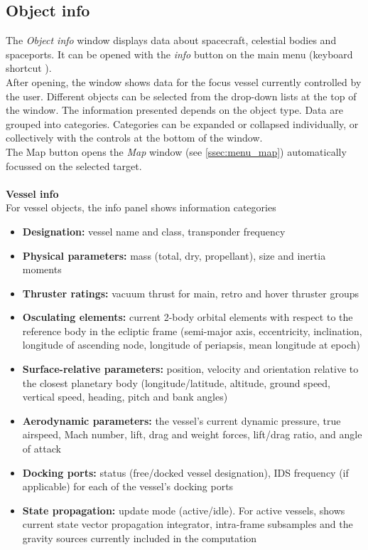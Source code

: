\documentclass[Orbiter User Manual.tex]{subfiles}
\begin{document}
\subsection{Object info}
\label{ssec:menu_info}
The \textit{Object info} window displays data about spacecraft, celestial bodies and spaceports. It can be opened with the \textit{info} button on the main menu (keyboard shortcut \Ctrl{}).\\
After opening, the window shows data for the focus vessel currently controlled by the user. Different objects can be selected from the drop-down lists at the top of the window. The information presented depends on the object type. Data are grouped into categories. Categories can be expanded or collapsed individually, or collectively with the controls at the bottom of the window.\\
The Map button opens the \textit{Map} window (see \ref{ssec:menu_map}) automatically focussed on the selected target.\\
\\
\textbf{Vessel info}\\
For vessel objects, the info panel shows information categories

\begin{figure}[H]
	\centering
\end{figure}

\noindent
\begin{itemize}
\item \textbf{Designation:} vessel name and class, transponder frequency
\item \textbf{Physical parameters:} mass (total, dry, propellant), size and inertia moments
\item \textbf{Thruster ratings:} vacuum thrust for main, retro and hover thruster groups
\item \textbf{Osculating elements:} current 2-body orbital elements with respect to the reference body in the ecliptic frame (semi-major axis, eccentricity, inclination, longitude of ascending node, longitude of periapsis, mean longitude at epoch)
\item \textbf{Surface-relative parameters:} position, velocity and orientation relative to the closest planetary body (longitude/latitude, altitude, ground speed, vertical speed, heading, pitch and bank angles)
\item \textbf{Aerodynamic parameters:} the vessel's current dynamic pressure, true airspeed, Mach number, lift, drag and weight forces, lift/drag ratio, and angle of attack
\item \textbf{Docking ports:} status (free/docked vessel designation), IDS frequency (if applicable) for each of the vessel's docking ports
\item \textbf{State propagation:} update mode (active/idle). For active vessels, shows current state vector propagation integrator, intra-frame subsamples and the gravity sources currently included in the computation
\end{itemize}
\end{document}
